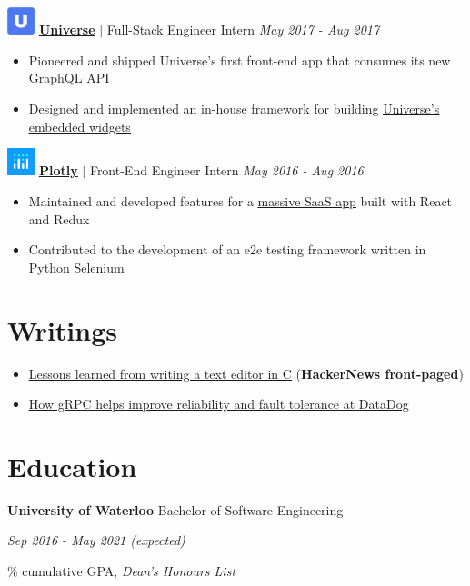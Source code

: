 \documentclass[paper=a4,fontsize=15pt]{scrartcl}
\newcommand{\quarterspace}{\vspace*{0.25em}}
\newcommand{\fullspace}{\vspace*{1em}}
\begin{document}
\fullspace
\noindent \includegraphics[width=0.8cm, height=0.8cm]{assets/universe.png}
\normalsize
\noindent \href{https://universe.com}{\ul{\textbf{Universe}}}
$\vert$ \small Full-Stack Engineer Intern
{\hfill \footnotesize \textit{May 2017 - Aug 2017}}
\begin{itemize}[noitemsep,leftmargin=20pt,label=\raisebox{0.25ex}{\tiny$\bullet$},topsep=5pt]
  \small
  \item Pioneered and shipped Universe's first front-end app that consumes its
    new GraphQL API
  \item Designed and implemented an in-house framework for building
    \href{https://www.universe.com/sell-tickets-on-your-website-with-universe-widgets}{\ul{Universe's
        embedded widgets}}
\end{itemize}

\fullspace
\noindent \includegraphics[width=0.8cm, height=0.8cm]{assets/plotly.png}
\normalsize
\noindent \href{https://plot.ly}{\textbf{\ul{Plotly}}}
$\vert$ \small Front-End Engineer Intern
{\hfill \footnotesize \textit{May 2016 - Aug 2016}}
\begin{itemize}[noitemsep,leftmargin=20pt,label=\raisebox{0.25ex}{\tiny$\bullet$},topsep=5pt]
  \small
  \item Maintained and developed features for a
    \href{https://plot.ly/online-chart-maker/}{\ul{massive SaaS app}} built with
    React and Redux
  \item Contributed to the development of an e2e testing framework written in
    Python Selenium
\end{itemize}

\section*{Writings}{}
\begin{itemize}[noitemsep,leftmargin=20pt,label=\raisebox{0.25ex}{\tiny$\bullet$},topsep=5pt]
  \small
  \item \href{http://lpan.io/what-i-learnt-from-viw}{\ul{Lessons learned from
        writing a text editor in C}} (\textbf{HackerNews front-paged})
  \item \href{http://lpan.io/migrating-to-grpc}{\ul{How gRPC helps improve
        reliability and fault tolerance at DataDog}}
\end{itemize}

\section*{Education}{}
\noindent \textbf{University of Waterloo} Bachelor of Software Engineering \par
\quarterspace
\footnotesize
\noindent \textit{Sep 2016 - May 2021 (expected)} \par
{}\% cumulative GPA, \textit{Dean's Honours List}
\end{document}
